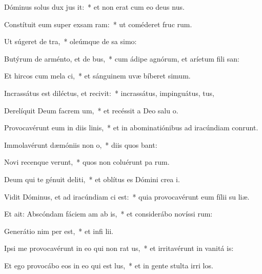 \item Dóminus solus dux jus it:~* et non erat cum eo deus nus.
\item Constítuit eum super exsam ram:~* ut coméderet fruc rum.
\item Ut súgeret  de tra,~* oleúmque de sa simo:
\item Butýrum de arménto, et  de bus,~* cum ádipe agnórum, et aríetum fili san:
\item Et hircos cum mela ci,~* et sánguinem uvæ bíberet simum.
\item Incrassátus est diléctus, et recivit:~* incrassátus, impinguátus, tus,
\item Derelíquit Deum facrem um,~* et recéssit a Deo salu o.
\item Provocavérunt eum in diis linis,~* et in abominatiónibus ad iracúndiam conrunt.
\item Immolavérunt dæmóniis  non o,~* diis quos bant:
\item Novi recenque verunt,~* quos non coluérunt pa rum.
\item Deum qui te génuit deliti,~* et oblítus es Dómini crea i.
\item \singlecolsep
\item Vidit Dóminus, et ad iracúndiam ci est:~* quia provocavérunt eum fílii su  liæ.
\item Et ait: Abscóndam fáciem am ab is,~* et considerábo novíssi rum:
\item Generátio nim per est,~* et infi lii.
\item Ipsi me provocavérunt in eo qui non rat us,~* et irritavérunt in vanitá is:
\item Et ego provocábo eos in eo qui  est lus,~* et in gente stulta irri los.
